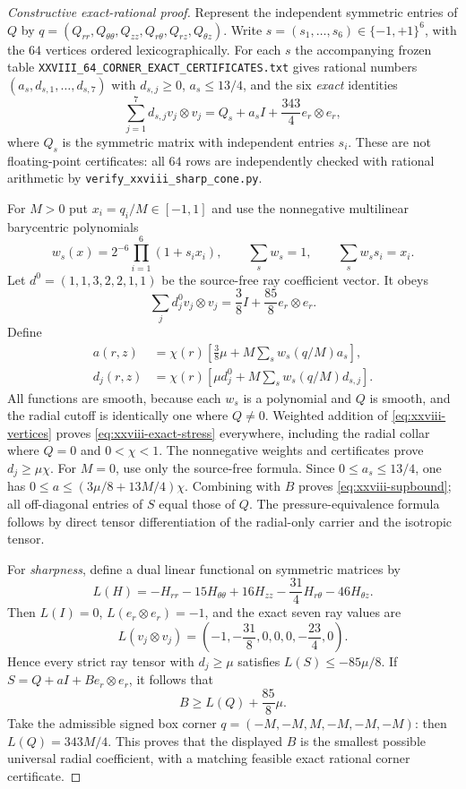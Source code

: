 \begin{proof}[Constructive exact-rational proof]
Represent the independent symmetric entries of $Q$ by
$q=(Q_{rr},Q_{\theta\theta},Q_{zz},
Q_{r\theta},Q_{rz},Q_{\theta z})$.
Write $s=(s_1,\ldots,s_6)\in\{-1,+1\}^6$, with the
$64$ vertices ordered lexicographically.
For each $s$ the accompanying frozen table
\texttt{XXVIII\_64\_CORNER\_EXACT\_CERTIFICATES.txt}
gives rational numbers
$(a_s,d_{s,1},\ldots,d_{s,7})$ with
$d_{s,j}\ge0$, $a_s\le13/4$, and the six \emph{exact} identities
\begin{equation}\label{eq:xxviii-vertices}
\sum_{j=1}^7d_{s,j}v_j\otimes v_j
=Q_s+a_sI+\frac{343}{4}e_r\otimes e_r,
\end{equation}
where $Q_s$ is the symmetric matrix with independent
entries $s_i$. These are not floating-point certificates:
all $64$ rows are independently checked with rational
arithmetic by \texttt{verify\_xxviii\_sharp\_cone.py}.

For $M>0$ put $x_i=q_i/M\in[-1,1]$ and use the nonnegative
multilinear barycentric polynomials
\[
w_s(x)=2^{-6}\prod_{i=1}^6(1+s_i x_i),\qquad
\sum_s w_s=1,\qquad
\sum_s w_s s_i=x_i.
\]
Let
$d^0=(1,1,3,2,2,1,1)$ be the source-free ray
coefficient vector. It obeys
\[
\sum_j d_j^0v_j\otimes v_j
=\frac38 I+\frac{85}{8}e_r\otimes e_r.
\]
Define
\begin{align*}
a(r,z)&=\chi(r)\left[\frac38\mu+
 M\sum_s w_s(q/M)a_s\right],\\
d_j(r,z)&=\chi(r)\left[\mu d_j^0+
 M\sum_s w_s(q/M)d_{s,j}\right].
\end{align*}
All functions are smooth, because each $w_s$ is a polynomial
and $Q$ is smooth, and the radial cutoff is identically one
where $Q\ne0$. Weighted addition of
\eqref{eq:xxviii-vertices} proves
\eqref{eq:xxviii-exact-stress} everywhere, including the
radial collar where $Q=0$ and $0<\chi<1$.
The nonnegative weights and certificates prove $d_j\ge\mu\chi$.
For $M=0$, use only the source-free formula. Since
$0\le a_s\le13/4$, one has
$0\le a\le(3\mu/8+13M/4)\chi$.
Combining with $B$ proves
\eqref{eq:xxviii-supbound}; all off-diagonal entries
of $S$ equal those of $Q$. The pressure-equivalence
formula follows by direct tensor differentiation of the
radial-only carrier and the isotropic tensor.

For \emph{sharpness}, define a dual linear functional on
symmetric matrices by
\[
L(H)=-H_{rr}-15H_{\theta\theta}+16H_{zz}
-\frac{31}{4}H_{r\theta}-46H_{\theta z}.
\]
Then $L(I)=0$, $L(e_r\otimes e_r)=-1$, and the exact
seven ray values are
\[
L(v_j\otimes v_j)
=\left(-1,-\frac{31}{8},0,0,0,-\frac{23}{4},0\right).
\]
Hence every strict ray tensor with $d_j\ge\mu$
satisfies $L(S)\le-85\mu/8$. If
$S=Q+aI+B e_r\otimes e_r$, it follows that
\[
B\ge L(Q)+\frac{85}{8}\mu.
\]
Take the admissible signed box corner
$q=(-M,-M,M,-M,-M,-M)$: then
$L(Q)=343M/4$. This proves that the displayed
$B$ is the smallest possible universal radial coefficient,
with a matching feasible exact rational corner certificate.
\end{proof}

